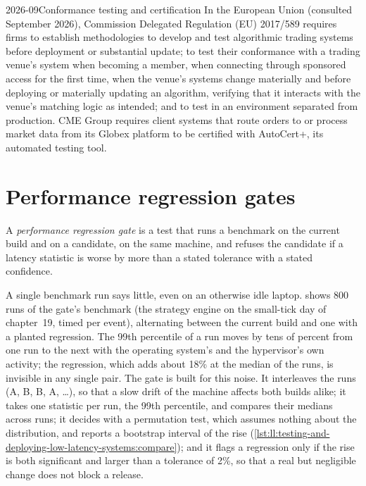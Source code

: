 \label{lst:ll:testing-and-deploying-low-latency-systems:certify}

\begin{dated}{2026-09}{Conformance testing and certification}\label{dat:ll:testing-and-deploying-low-latency-systems:cert}
In the European Union (consulted September 2026), Commission Delegated Regulation (EU) 2017/589 requires firms to establish
methodologies to develop and test algorithmic trading systems before deployment or substantial update; to test their
conformance with a trading venue's system when becoming a member, when connecting through sponsored access for the first time,
when the venue's systems change materially and before deploying or materially updating an algorithm, verifying that it
interacts with the venue's matching logic as intended; and to test in an environment separated from production. CME Group
requires client systems that route orders to or process market data from its Globex platform to be certified with AutoCert+,
its automated testing tool.
\end{dated}

\section{Performance regression gates}

\begin{definition}\label{def:ll:testing-and-deploying-low-latency-systems:gate}
A \emph{performance regression gate} is a test that runs a benchmark on the current build
and on a candidate, on the same machine, and refuses the candidate if a latency statistic is worse by more than a stated
tolerance with a stated confidence.
\end{definition}

A single benchmark run says little, even on an otherwise idle laptop.  shows 800
runs of the gate's benchmark (the strategy engine on the small-tick day of chapter~19, timed per event), alternating between the
current build and one with a planted regression. The 99th percentile of a run moves by tens of percent from one run to the
next with the operating system's and the hypervisor's own activity; the regression, which adds about 18\% at the median of
the runs, is invisible in
any single pair. The gate is built for this noise. It interleaves the runs (A, B, B, A, \dots), so that a slow drift of the
machine affects both builds alike; it takes one statistic per run, the 99th percentile, and compares their medians across runs;
it decides with a permutation test, which assumes nothing about the distribution, and reports a bootstrap interval of the rise
(\cref{lst:ll:testing-and-deploying-low-latency-systems:compare}); and it flags a regression only if the rise is both significant
and larger than a tolerance of 2\%, so that a real but negligible change does not block a release.

